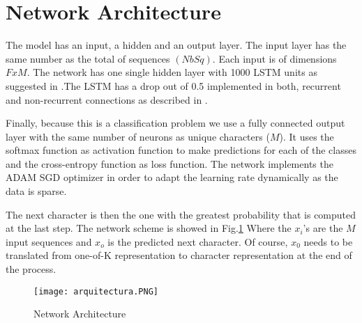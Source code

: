\section{Network Architecture}

The model has an input, a hidden and an output layer. The input layer has the same number as the total of sequences $(NbSq)$. Each input is of dimensions $FxM$. The network has one single hidden layer with 1000 LSTM units as suggested in \cite{graves2013generating}.The LSTM has a drop out of 0.5 implemented  in both, recurrent and non-recurrent connections as described in \cite{gal2015theoretically}. 

Finally, because this is a classification problem we use a fully connected output layer with the same number of neurons as unique characters ($M$). It uses the softmax function as activation function to make predictions for each of the classes and the cross-entropy function as loss function. The network implements the  ADAM SGD optimizer in order to adapt the learning rate dynamically as the data is sparse. 

The next character is then the one with the greatest probability that is computed at the last step. The network scheme is showed in Fig.\ref{fig:netarch}  Where the $x_{i}$'s are the $M$ input sequences and $x_o$ is the predicted next character. Of course, $x_0$ needs to be translated from one-of-K representation to character representation at the end of the process.

\begin{figure}[h]
\centering
\texttt{[image: arquitectura.PNG]}
\caption{Network Architecture}
\label{fig:netarch}
\end{figure}























